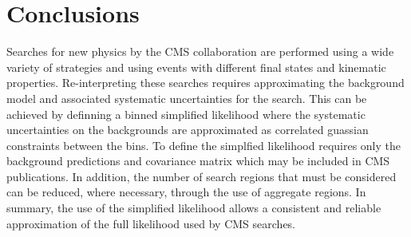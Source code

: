 \section{Conclusions}
\label{sec:conclusions}
Searches for new physics by the CMS collaboration are performed using a wide variety of 
strategies and using events with different final states and kinematic properties. 
Re-interpreting these searches requires approximating the background model
and associated systematic uncertainties for the search. This can be 
achieved by definning a binned simplified likelihood where the systematic 
uncertainties on the backgrounds are approximated as correlated guassian constraints between the bins. 
To define the simplfied likelihood requires only the background predictions and covariance matrix which may be 
included in CMS publications. In addition, the number of search regions that must
be considered can be reduced, where necessary, through the use of aggregate regions. In summary, 
the use of the simplified likelihood allows a consistent and reliable approximation of the 
full likelihood used by CMS searches.



